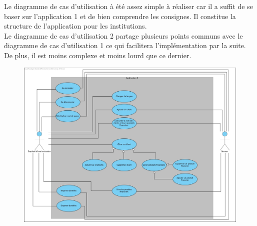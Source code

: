 \documentclass[../rapport.tex]{subfiles}
\begin{document}
Le diagramme de cas d'utilisation à été assez simple à réaliser car il a suffit de se baser sur l'application 1 et de bien comprendre les consignes.
Il constitue la structure de l'application pour les institutions. \\
Le diagramme de cas d'utilisation 2 partage plusieurs points communs avec le diagramme de cas d'utilisation 1 ce qui facilitera l'implémentation par la suite. De plus, il est moins complexe et moins lourd que ce dernier.

\begin{figure}[h!]
	\centering \includegraphics[scale=0.30]{ressources/photos_diagrammes/app2/use_case_app2.jpg}
\end{figure}
\end{document}
